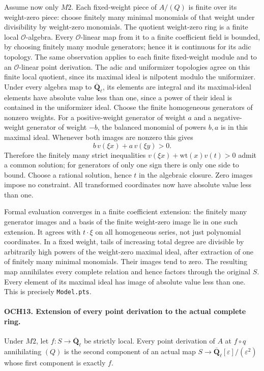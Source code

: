 Assume now only \(M2\).  Each fixed-weight piece of \(A/(Q)\)
is finite over its weight-zero piece: choose finitely many minimal
monomials of that weight under divisibility by weight-zero monomials.
The quotient weight-zero ring is a finite local
\(\mathcal O\)-algebra.  Every \(\mathcal O\)-linear map
from it to a finite coefficient field is bounded, by choosing finitely
many module generators; hence it is continuous for its adic topology.
The same observation applies to each finite fixed-weight module and
to an \(\mathcal O\)-linear point derivation.  The adic and
uniformizer topologies agree on this finite local quotient, since
its maximal ideal is nilpotent modulo the uniformizer.
Under every algebra map to
\(\overline{\mathbf Q}_\ell\), its elements are integral and
its maximal-ideal elements have absolute value less than one,
since a power of their ideal is contained in the uniformizer ideal.
Choose the finite homogeneous generators of nonzero weights.
For a positive-weight generator of weight \(a\) and a
negative-weight generator of weight \(-b\), the balanced
monomial of powers \(b,a\) is in this maximal ideal.  Whenever
both images are nonzero this gives
\[
              b\,v(\xi x)+a\,v(\xi y)>0.
\]
Therefore the finitely many strict inequalities
\(v(\xi x)+\mathrm{wt}(x)v(t)>0\) admit a common solution;
for generators of only one sign there is only one side to bound.
Choose a rational solution, hence \(t\) in the algebraic closure.
Zero images impose no constraint.  All transformed coordinates now
have absolute value less than one.

Formal evaluation converges in a finite coefficient extension:
the finitely many generator images and a basis of the finite
weight-zero image lie in one such extension.  It agrees with
\(t\cdot\xi\) on all homogeneous series, not just polynomial
coordinates.  In a fixed weight, tails of increasing total degree
are divisible by arbitrarily high powers of the weight-zero maximal
ideal, after extraction of one of finitely many minimal monomials.
Their images tend to zero.  The resulting map annihilates every
complete relation and hence factors through the original \(S\).
Every element of its maximal ideal has image of absolute value
less than one.  This is precisely \texttt{Model.pts}.

\paragraph{OCH13. Extension of every point derivation to the actual complete ring.}
\label{claim:OCH13}
Under \(M2\), let \(f:S\to\overline{\mathbf Q}_\ell\)
be strictly local.  Every point derivation of \(A\) at
\(f\circ q\) annihilating \((Q)\) is the second component
of an actual map
\(S\to\overline{\mathbf Q}_\ell[\varepsilon]/(\varepsilon^2)\)
whose first component is exactly \(f\).


